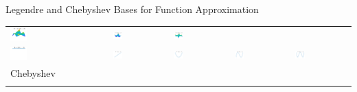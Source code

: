 \documentclass[10pt,compress,xcolor={usenames,dvipsnames},aspectratio=169]{beamer}
\begin{document}
\begin{frame}{Legendre and Chebyshev Bases for Function Approximation}
\begin{tabular}{>{\centering}m{}>{\centering}m{}>{\centering}m{}>{\centering}m{}>{\centering}m{}}
\includegraphics[width =0.18\textwidth]{ProgramsImages/Legendre_Degree_1_3.png}  &
\includegraphics[width =0.18\textwidth]{ProgramsImages/Legendre_Degree_2_2.png}  &
\includegraphics[width =0.18\textwidth]{ProgramsImages/Legendre_Degree_2_3.png} 
\tabularnewline[0ex]
		\includegraphics[width =0.18\textwidth]{ProgramsImages/Chebyshev_Degree_0.png}  &
\includegraphics[width =0.18\textwidth]{ProgramsImages/Chebyshev_Degree_1.png}  &
\includegraphics[width =0.18\textwidth]{ProgramsImages/Chebyshev_Degree_2.png}  &
\includegraphics[width =0.18\textwidth]{ProgramsImages/Chebyshev_Degree_3.png}  &
\includegraphics[width =0.18\textwidth]{ProgramsImages/Chebyshev_Degree_4.png} 
\tabularnewline[-7ex]
Chebyshev \tabularnewline
\tabularnewline

\end{tabular}
\end{frame}
\end{document}
